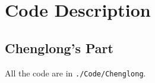 \documentclass[12pt]{article}
\begin{document}
{{

\section{Code Description}
\subsection{Chenglong's Part}
All the code are in \texttt{./Code/Chenglong}.
}}
\end{document}
